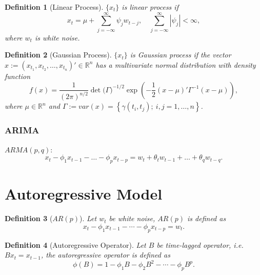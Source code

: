 \documentclass[10pt]{article}
\theoremstyle{remark}
\theoremstyle{plain}
\newtheorem{Definition}{Definition}[section]
\newcommand{\R}{\mathbb{R}}
\numberwithin{equation}{section}
\begin{document}
\begin{Definition}[Linear Process]
	$\{x_t\}$ is linear process if 
	\[
	x_t = \mu + \sum_{j=-\infty}^\infty \psi_j w_{t-j}, \quad \sum_{j=-\infty}^\infty |\psi_j|< \infty,
	\]
	where $w_t$ is white noise.
\end{Definition}

\begin{Definition}[Gaussian Process]
	$\{x_t\}$ is Gaussian process if the vector $x := (x_{t_1}, x_{t_2},\dots, x_{t_n})' \in \R^n$ has a multivariate normal distribution with density function
	\[
	f(x) = \frac{1}{(2\pi)^{n/2}} \det\big(\Gamma\big)^{-1/2} \exp \left(-\frac{1}{2} (x-\mu)' \Gamma^{-1} (x-\mu) \right),
	\]
	where $\mu \in \R^n$ and $\Gamma:= var (x) = \left\{ \gamma(t_i, t_j);\ i,j=1,\dots,n\right\}$.
\end{Definition}

\subsubsection{ARIMA}
$ARMA(p,q)$: 
\[
x_t - \phi_1 x_{t-1} - \dots - \phi_p x_{t-p} = w_t + \theta_t w_{t-1} + \dots + \theta_q w_{t-q}.
\]

\section{Autoregressive Model}

\begin{Definition}[$AR(p)$]
	Let $w_t$ be white noise, $AR(p)$ is defined as 
	\[
	x_t - \phi_1 x_{t-1} - \cdots - \phi_p x_{t-p} = w_t.
	\]
\end{Definition}

\begin{Definition}[Autoregressive Operator]
	Let $B$ be time-lagged operator, i.e. $Bx_t = x_{t-1}$, the autoregressive operator is defined as
	\[
	\phi(B) = 1-\phi_1 B - \phi_2 B^2 - \cdots - \phi_p B^p.
	\]
\end{Definition}
\end{document}

